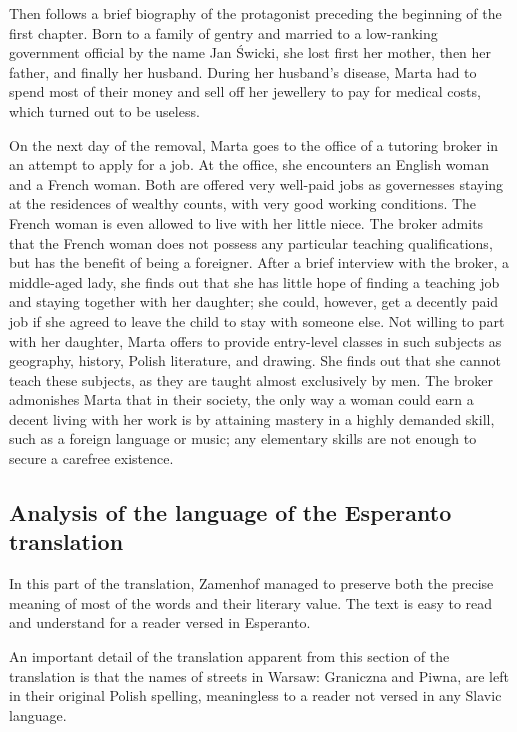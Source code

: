 Then follows a brief biography of the protagonist preceding the beginning of the first chapter.
Born to a family of gentry and married to a low-ranking government official by the name Jan Świcki, she lost first her mother, then her father, and finally her husband.
During her husband's disease, Marta had to spend most of their money and sell off her jewellery to pay for medical costs, which turned out to be useless.

On the next day of the removal, Marta goes to the office of a tutoring broker in an attempt to apply for a job.
At the office, she encounters an English woman and a French woman.
Both are offered very well-paid jobs as governesses staying at the residences of wealthy counts, with very good working conditions.
The French woman is even allowed to live with her little niece.
The broker admits that the French woman does not possess any particular teaching qualifications, but has the benefit of being a foreigner.
After a brief interview with the broker, a middle-aged lady, she finds out that she has little hope of finding a teaching job and staying together with her daughter; she could, however, get a decently paid job if she agreed to leave the child to stay with someone else.
Not willing to part with her daughter, Marta offers to provide entry-level classes in such subjects as geography, history, Polish literature, and drawing.
She finds out that she cannot teach these subjects, as they are taught almost exclusively by men.
The broker admonishes Marta that in their society, the only way a woman could earn a decent living with her work is by attaining mastery in a highly demanded skill, such as a foreign language or music; any elementary skills are not enough to secure a carefree existence.

\subsection{Analysis of the language of the Esperanto translation}

In this part of the translation, Zamenhof managed to preserve both the precise meaning of most of the words and their literary value. The text is easy to read and understand for a reader versed in Esperanto.

An important detail of the translation apparent from this section of the translation is that the names of streets in Warsaw: Graniczna and Piwna, are left in their original Polish spelling, meaningless to a reader not versed in any Slavic language. %

